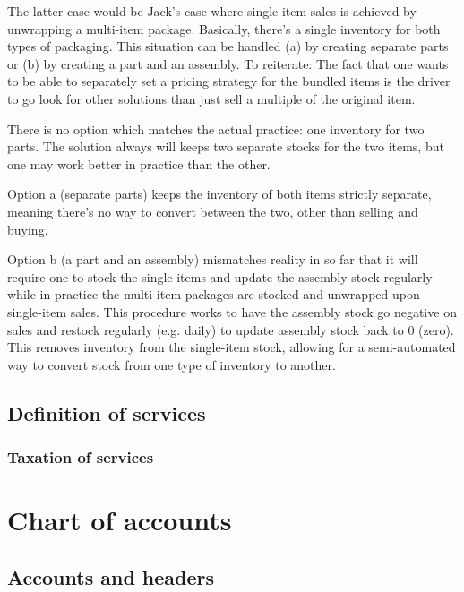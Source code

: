 The latter case would be Jack's case where single-item sales is achieved by unwrapping
a multi-item package. Basically, there's a single inventory for both types of packaging.
This situation can be handled (a) by creating separate parts or (b) by creating a part and an
assembly.
To reiterate: The fact that one wants to be able to separately set a pricing strategy
for the bundled items is the driver to go look for other solutions than just sell a
multiple of the original item.

There is no option which matches the actual practice: one inventory for two parts. The solution
always will keeps two separate stocks for the two items, but one may work better in practice
than the other.

Option a (separate parts) keeps the inventory of both items strictly separate,
meaning there's no way to convert between the two, other than selling and buying.

Option b (a part and an assembly) mismatches reality in so far that it will require one
to stock the single items and update the assembly stock regularly while in practice the
multi-item packages are stocked and unwrapped upon single-item sales. This procedure works
to have the assembly stock go negative on sales and restock regularly (e.g. daily) to
update assembly stock back to 0 (zero). This removes inventory from the single-item stock,
allowing for a semi-automated way to convert stock from one type of inventory to another.


\section{Definition of services}
\label{sec-products-services-definition}

\subsection{Taxation of services}
\label{subsec-products-services-taxation}



\chapter{Chart of accounts}
\label{cha-chart-of-accounts}

\section{Accounts and headers}
\label{sec-coa-accounts-and-headers}

